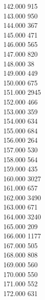 { 142.000	915 \\
 143.000	950 \\
 144.000	367 \\
 145.000	471 \\
 146.000	565 \\
 147.000	820 \\
 148.000	38 \\
 149.000	449 \\
 150.000	675 \\
 151.000	2945 \\
 152.000	466 \\
 153.000	359 \\
 154.000	634 \\
 155.000	684 \\
 156.000	264 \\
 157.000	530 \\
 158.000	564 \\
 159.000	435 \\
 160.000	3027 \\
 161.000	657 \\
 162.000	3490 \\
 163.000	671 \\
 164.000	3240 \\
 165.000	209 \\
 166.000	1177 \\
 167.000	505 \\
 168.000	808 \\
 169.000	560 \\
 170.000	550 \\
 171.000	552 \\
 172.000	631 \\
}
